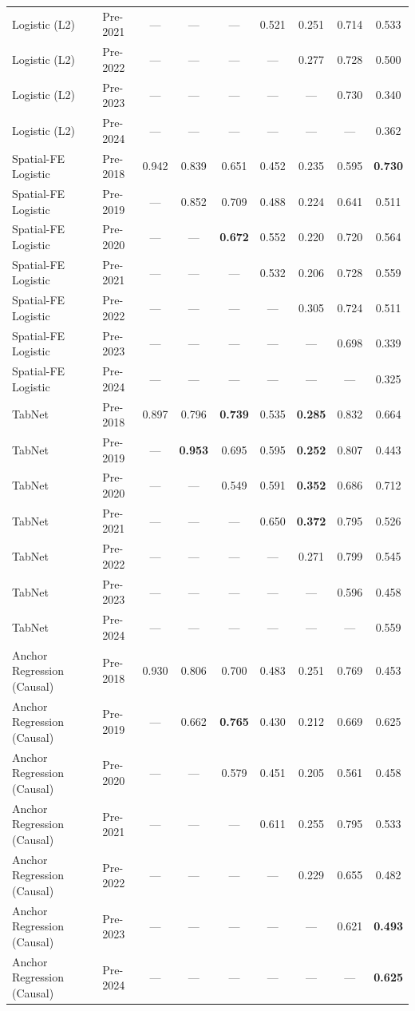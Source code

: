 \begin{table}[htbp]
{\begin{tabular}{l lccccccc}
Logistic (L2) & Pre-2021 & --- & --- & --- & 0.521 & 0.251 & 0.714 & 0.533 \\
Logistic (L2) & Pre-2022 & --- & --- & --- & --- & 0.277 & 0.728 & 0.500 \\
Logistic (L2) & Pre-2023 & --- & --- & --- & --- & --- & 0.730 & 0.340 \\
Logistic (L2) & Pre-2024 & --- & --- & --- & --- & --- & --- & 0.362 \\
Spatial-FE Logistic & Pre-2018 & 0.942 & 0.839 & 0.651 & 0.452 & 0.235 & 0.595 & \textbf{0.730} \\
Spatial-FE Logistic & Pre-2019 & --- & 0.852 & 0.709 & 0.488 & 0.224 & 0.641 & 0.511 \\
Spatial-FE Logistic & Pre-2020 & --- & --- & \textbf{0.672} & 0.552 & 0.220 & 0.720 & 0.564 \\
Spatial-FE Logistic & Pre-2021 & --- & --- & --- & 0.532 & 0.206 & 0.728 & 0.559 \\
Spatial-FE Logistic & Pre-2022 & --- & --- & --- & --- & 0.305 & 0.724 & 0.511 \\
Spatial-FE Logistic & Pre-2023 & --- & --- & --- & --- & --- & 0.698 & 0.339 \\
Spatial-FE Logistic & Pre-2024 & --- & --- & --- & --- & --- & --- & 0.325 \\
TabNet & Pre-2018 & 0.897 & 0.796 & \textbf{0.739} & 0.535 & \textbf{0.285} & 0.832 & 0.664 \\
TabNet & Pre-2019 & --- & \textbf{0.953} & 0.695 & 0.595 & \textbf{0.252} & 0.807 & 0.443 \\
TabNet & Pre-2020 & --- & --- & 0.549 & 0.591 & \textbf{0.352} & 0.686 & 0.712 \\
TabNet & Pre-2021 & --- & --- & --- & 0.650 & \textbf{0.372} & 0.795 & 0.526 \\
TabNet & Pre-2022 & --- & --- & --- & --- & 0.271 & 0.799 & 0.545 \\
TabNet & Pre-2023 & --- & --- & --- & --- & --- & 0.596 & 0.458 \\
TabNet & Pre-2024 & --- & --- & --- & --- & --- & --- & 0.559 \\
Anchor Regression (Causal) & Pre-2018 & 0.930 & 0.806 & 0.700 & 0.483 & 0.251 & 0.769 & 0.453 \\
Anchor Regression (Causal) & Pre-2019 & --- & 0.662 & \textbf{0.765} & 0.430 & 0.212 & 0.669 & 0.625 \\
Anchor Regression (Causal) & Pre-2020 & --- & --- & 0.579 & 0.451 & 0.205 & 0.561 & 0.458 \\
Anchor Regression (Causal) & Pre-2021 & --- & --- & --- & 0.611 & 0.255 & 0.795 & 0.533 \\
Anchor Regression (Causal) & Pre-2022 & --- & --- & --- & --- & 0.229 & 0.655 & 0.482 \\
Anchor Regression (Causal) & Pre-2023 & --- & --- & --- & --- & --- & 0.621 & \textbf{0.493} \\
Anchor Regression (Causal) & Pre-2024 & --- & --- & --- & --- & --- & --- & \textbf{0.625} \\
\bottomrule
\end{tabular}%
}
\end{table}